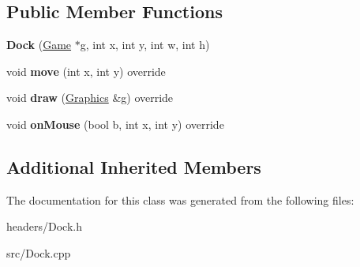 \subsection*{Public Member Functions}
\begin{DoxyCompactItemize}
\item 
\hypertarget{class_dock_ab6358124b92d41bee01b47aae633ba4e}{}\label{class_dock_ab6358124b92d41bee01b47aae633ba4e} 
{\bfseries Dock} (\hyperlink{class_game}{Game} $\ast$g, int x, int y, int w, int h)
\item 
\hypertarget{class_dock_a4dc4c069680a6fb3bb6e8656296a8bb7}{}\label{class_dock_a4dc4c069680a6fb3bb6e8656296a8bb7} 
void {\bfseries move} (int x, int y) override
\item 
\hypertarget{class_dock_a2e64fed55b6e670af42f4b360f2210ea}{}\label{class_dock_a2e64fed55b6e670af42f4b360f2210ea} 
void {\bfseries draw} (\hyperlink{class_graphics}{Graphics} \&g) override
\item 
\hypertarget{class_dock_a9ff981e9c2dfe3614e332aa4c4f8fcee}{}\label{class_dock_a9ff981e9c2dfe3614e332aa4c4f8fcee} 
void {\bfseries on\+Mouse} (bool b, int x, int y) override
\end{DoxyCompactItemize}
\subsection*{Additional Inherited Members}


The documentation for this class was generated from the following files\+:\begin{DoxyCompactItemize}
\item 
headers/Dock.\+h\item 
src/Dock.\+cpp\end{DoxyCompactItemize}

